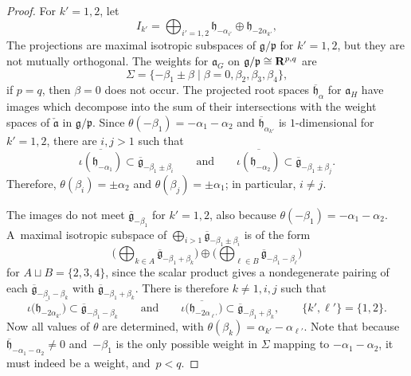 \documentclass[10pt,a4paper]{amsart}
\numberwithin{equation}{section}
\theoremstyle{definition}
\newcommand{\BR}{{\bf R}}
\newcommand{\lieg}{\mathfrak{g}}
\newcommand{\lieh}{\mathfrak{h}}
\def\p{{\mathfrak p}}
\def\a{{\mathfrak a}}
\begin{document}
\begin{proof}
For $k'=1,2$, let
\[I_{k'} = \bigoplus_{i'=1,2} \lieh_{- \alpha_{i'}} \oplus \lieh_{- 2 \alpha_{k'}}, \]
The projections  are maximal isotropic subspaces of $\lieg/\p$ for $k'=1,2$, but they are not mutually orthogonal.
 The weights for $\a_G$ on $\lieg/\p \cong \BR^{p,q}$ are
\[\Sigma = \{ - \beta_1 \pm \beta \mid \beta = 0, \beta_2, \beta_3, \beta_4 \},\]
if $p=q$, then $\beta=0$ does not occur.
The projected root spaces $\overline{\lieh}_\alpha$ for $\a_H$ have images \smash{$\overline{\iota(\lieh_{\alpha})}$} which decompose into the sum of their intersections with the weight spaces of $\check{\a}$ in $\lieg/\p$.
Since $\theta(- \beta_1) = - \alpha_1 - \alpha_2$ and $\overline{\lieh}_{\alpha_{k'}}$ is $1$-dimensional for $k'=1,2$, there are $i,j > 1$ such that
\[ \overline{\iota(\lieh_{-\alpha_1})} \subset \overline{\lieg}_{- \beta_1 \pm \beta_i} \qquad \mbox{and} \qquad \overline{\iota(\lieh_{-\alpha_2})} \subset \overline{\lieg}_{- \beta_1 \pm \beta_j}.\]
Therefore, $\theta(\beta_i) = \pm \alpha_2$ and $\theta(\beta_j) = \pm \alpha_1$; in particular, $i \neq j$.

The images \smash{$\overline{\iota\bigl(\lieh_{- 2 \alpha_{k'}}\bigr)}$} do not meet $\overline{\lieg}_{- \beta_1}$ for $k'=1,2$, also because $\theta(- \beta_1) = - \alpha_1 - \alpha_2$.
A~maximal isotropic subspace of
 $ \bigoplus_{i > 1} \overline{\lieg}_{- \beta_1 \pm \beta_i}$ is of the form
 \begin{equation*}
 \biggl( \bigoplus_{k \in A} \overline{\lieg}_{- \beta_1 + \beta_k} \biggr) \oplus \biggl( \bigoplus_{\ell \in B} \overline{\lieg}_{- \beta_1 - \beta_\ell} \biggr)
\end{equation*}
 for $A \sqcup B = \{ 2, 3,4 \}$, since the scalar product gives a nondegenerate pairing of each $\overline{\lieg}_{- \beta_1 - \beta_k}$ with $\overline{\lieg}_{- \beta_1 + \beta_k}$. There is therefore $k \neq 1, i, j$ such that
 \[ \overline{\iota\bigl(\lieh_{- 2 \alpha_{k'}}\bigr)} \subset \overline{\lieg}_{- \beta_1 - \beta_k} \qquad \mbox{and} \qquad \overline{\iota\bigl(\lieh_{- 2 \alpha_{\ell'}}\bigr)} \subset \overline{\lieg}_{- \beta_1 + \beta_k}, \qquad \bigl\{ k', \ell' \bigr\} = \{ 1,2 \}.\]
 Now all values of $\theta$ are determined, with $\theta(\beta_k) = \alpha_{k'} - \alpha_{\ell'}$.
Note that because $\overline{\lieh}_{- \alpha_1 - \alpha_2} \neq 0$ and~$- \beta_1$ is the only possible weight in $\Sigma$ mapping to $- \alpha_1 - \alpha_2$, it must indeed be a weight, and~${p < q}$.


\end{proof}
\end{document}
